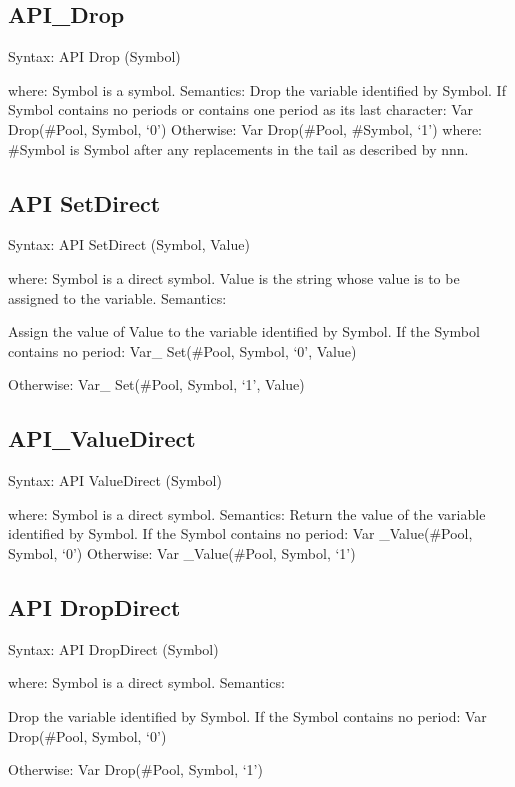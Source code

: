 \subsection{API\_Drop}\label{api_drop}

Syntax: API Drop (Symbol)

where: Symbol is a symbol. Semantics: Drop the variable identified by
Symbol. If Symbol contains no periods or contains one period as its last
character: Var Drop(\#Pool, Symbol, `0') Otherwise: Var Drop(\#Pool,
\#Symbol, `1') where: \#Symbol is Symbol after any replacements in the
tail as described by nnn.

\subsection{API SetDirect}\label{api-setdirect}

Syntax: API SetDirect (Symbol, Value)

where: Symbol is a direct symbol. Value is the string whose value is to
be assigned to the variable. Semantics:

Assign the value of Value to the variable identified by Symbol. If the
Symbol contains no period: Var\_ Set(\#Pool, Symbol, `0', Value)

Otherwise: Var\_ Set(\#Pool, Symbol, `1', Value)

\subsection{API\_ValueDirect}\label{api_valuedirect}

Syntax: API ValueDirect (Symbol)

where: Symbol is a direct symbol. Semantics: Return the value of the
variable identified by Symbol. If the Symbol contains no period: Var
\_Value(\#Pool, Symbol, `0') Otherwise: Var \_Value(\#Pool, Symbol, `1')

\subsection{API DropDirect}\label{api-dropdirect}

Syntax: API DropDirect (Symbol)

where: Symbol is a direct symbol. Semantics:

Drop the variable identified by Symbol. If the Symbol contains no
period: Var Drop(\#Pool, Symbol, `0')

Otherwise: Var Drop(\#Pool, Symbol, `1')


